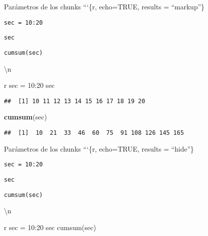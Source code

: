 \documentclass[
  ignorenonframetext,
]{beamer}
\newenvironment{Shaded}{\begin{snugshade}}{\end{snugshade}}
\newcommand{\FunctionTok}[1]{\textcolor[rgb]{0.13,0.29,0.53}{\textbf{#1}}}
\newcommand{\NormalTok}[1]{#1}
\begin{document}
\begin{frame}[fragile]{Parámetros de los chunks}
\protect\hypertarget{paruxe1metros-de-los-chunks-2}{}
```\{r, echo=TRUE, results = ``markup''\}

\texttt{sec\ =\ 10:20}

\texttt{sec}

\texttt{cumsum(sec)}

\begin{Shaded}
\begin{Highlighting}[]

\NormalTok{\textbackslash{}n}


\NormalTok{\textasciigrave{}\textasciigrave{}\textasciigrave{}r}
\NormalTok{sec = 10:20}
\NormalTok{sec}
\end{Highlighting}
\end{Shaded}

\begin{verbatim}
##  [1] 10 11 12 13 14 15 16 17 18 19 20
\end{verbatim}

\begin{Shaded}
\begin{Highlighting}[]
\FunctionTok{cumsum}\NormalTok{(sec)}
\end{Highlighting}
\end{Shaded}

\begin{verbatim}
##  [1]  10  21  33  46  60  75  91 108 126 145 165
\end{verbatim}
\end{frame}

\begin{frame}[fragile]{Parámetros de los chunks}
\protect\hypertarget{paruxe1metros-de-los-chunks-3}{}
```\{r, echo=TRUE, results = ``hide''\}

\texttt{sec\ =\ 10:20}

\texttt{sec}

\texttt{cumsum(sec)}

\begin{Shaded}
\begin{Highlighting}[]

\NormalTok{\textbackslash{}n}


\NormalTok{\textasciigrave{}\textasciigrave{}\textasciigrave{}r}
\NormalTok{sec = 10:20}
\NormalTok{sec}
\NormalTok{cumsum(sec)}
\end{Highlighting}
\end{Shaded}
\end{frame}
\end{document}
